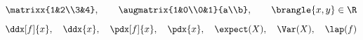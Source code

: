 \[
\matrixx{1&2\\3&4},\qquad
\augmatrix{1&0\\0&1}{a\\b},\qquad
\brangle{x,y}\in\R
\]
\[
\ddx[f]{x},\quad \ddx{x},\quad
\pdx[f]{x},\quad \pdx{x},\quad
\expect(X),\quad \Var(X),\quad \lap(f)
\]
